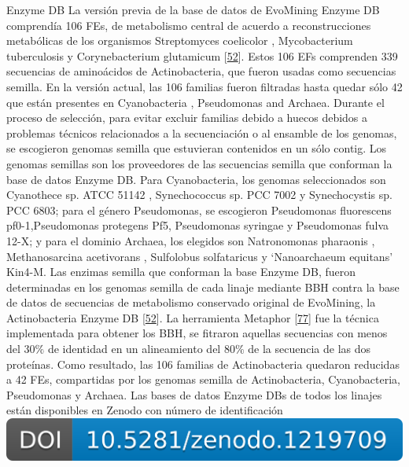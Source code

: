 \documentclass[12pt,twoside]{reedthesis}
\begin{document}
  Enzyme DB La versión previa de la base de datos de EvoMining Enzyme DB
  comprendía 106 FEs, de metabolismo central de acuerdo a reconstrucciones
  metabólicas de los organismos Streptomyces coelicolor , Mycobacterium
  tuberculosis y Corynebacterium glutamicum
  {[}\protect\hyperlink{ref-cruz-morales_phylogenomic_2016}{52}{]}. Estos
  106 EFs comprenden 339 secuencias de aminoácidos de Actinobacteria, que
  fueron usadas como secuencias semilla. En la versión actual, las 106
  familias fueron filtradas hasta quedar sólo 42 que están presentes en
  Cyanobacteria , Pseudomonas and Archaea. Durante el proceso de
  selección, para evitar excluir familias debido a huecos debidos a
  problemas técnicos relacionados a la secuenciación o al ensamble de los
  genomas, se escogieron genomas semilla que estuvieran contenidos en un
  sólo contig. Los genomas semillas son los proveedores de las secuencias
  semilla que conforman la base de datos Enzyme DB. Para Cyanobacteria,
  los genomas seleccionados son Cyanothece sp. ATCC 51142 , Synechococcus
  sp. PCC 7002 y Synechocystis sp. PCC 6803; para el género Pseudomonas,
  se escogieron Pseudomonas fluorescens pf0-1,Pseudomonas protegens Pf5,
  Pseudomonas syringae y Pseudomonas fulva 12-X; y para el dominio
  Archaea, los elegidos son Natronomonas pharaonis , Methanosarcina
  acetivorans , Sulfolobus solfataricus y `Nanoarchaeum equitans' Kin4-M.
  Las enzimas semilla que conforman la base Enzyme DB, fueron determinadas
  en los genomas semilla de cada linaje mediante BBH contra la base de
  datos de secuencias de metabolismo conservado original de EvoMining, la
  Actinobacteria Enzyme DB
  {[}\protect\hyperlink{ref-cruz-morales_phylogenomic_2016}{52}{]}. La
  herramienta Metaphor
  {[}\protect\hyperlink{ref-van_der_veen_metaphor_2014}{77}{]} fue la
  técnica implementada para obtener los BBH, se fitraron aquellas
  secuencias con menos del \(30\%\) de identidad en un alineamiento del
  \(80\%\) de la secuencia de las dos proteínas. Como resultado, las 106
  familias de Actinobacteria quedaron reducidas a 42 FEs, compartidas por
  los genomas semilla de Actinobacteria, Cyanobacteria, Pseudomonas y
  Archaea. Las bases de datos Enzyme DBs de todos los linajes están
  disponibles en Zenodo con número de identificación
  \href{https://doi.org/10.5281/zenodo.1219709}{\includegraphics{chapter2/zenodo_1219709.png}}
  
\end{document}
